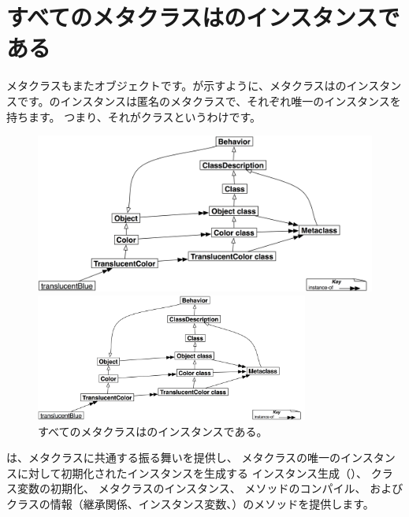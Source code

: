 \documentclass[a4paper,10pt,twoside]{book}
\begin{document}
\section{すべてのメタクラスはのインスタンスである}

メタクラスもまたオブジェクトです。が示すように、メタクラスはのインスタンスです。のインスタンスは匿名のメタクラスで、それぞれ唯一のインスタンスを持ちます。
つまり、それがクラスというわけです。

\begin{center}
\begin{figure}
\ifluluelse
	{\centerline{\includegraphics[width=\textwidth]{TranslucentMetaclassClass}}}
	{\centerline{\includegraphics[width=0.8\textwidth]{TranslucentMetaclassClass}}}
\caption{すべてのメタクラスはのインスタンスである。}
\end{figure}
\end{center}

は、メタクラスに共通する振る舞いを提供し、
メタクラスの唯一のインスタンスに対して初期化されたインスタンスを生成する
インスタンス生成（）、
クラス変数の初期化、
メタクラスのインスタンス、
メソッドのコンパイル、%
およびクラスの情報（継承関係、インスタンス変数、\etc）のメソッドを提供します。
\end{document}
